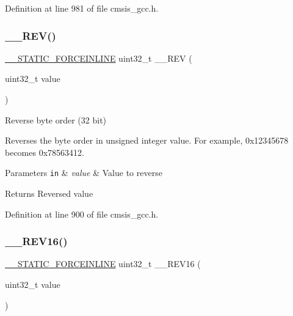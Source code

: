 Definition at line 981 of file cmsis\+\_\+gcc.\+h.

\mbox{\label{group___c_m_s_i_s___core___instruction_interface_gadb92679719950635fba8b1b954072695}} 
\subsubsection{\texorpdfstring{\+\_\+\+\_\+\+R\+E\+V()}{\_\_REV()}}
{\footnotesize\ttfamily \hyperlink{cmsis__iccarm_8h_ab904513442afdf77d4f8c74f23cbb040}{\+\_\+\+\_\+\+S\+T\+A\+T\+I\+C\+\_\+\+F\+O\+R\+C\+E\+I\+N\+L\+I\+NE} uint32\+\_\+t \+\_\+\+\_\+\+R\+EV (\begin{DoxyParamCaption}\item[{uint32\+\_\+t}]{value }\end{DoxyParamCaption})}



Reverse byte order (32 bit) 

Reverses the byte order in unsigned integer value. For example, 0x12345678 becomes 0x78563412. 
\begin{DoxyParams}[1]{Parameters}
\mbox{\tt in}  & {\em value} & Value to reverse \\
\hline
\end{DoxyParams}
\begin{DoxyReturn}{Returns}
Reversed value 
\end{DoxyReturn}


Definition at line 900 of file cmsis\+\_\+gcc.\+h.

\mbox{\label{group___c_m_s_i_s___core___instruction_interface_gaa12aedd096506c9639c1581acd5c6a78}} 
\subsubsection{\texorpdfstring{\+\_\+\+\_\+\+R\+E\+V16()}{\_\_REV16()}}
{\footnotesize\ttfamily \hyperlink{cmsis__iccarm_8h_ab904513442afdf77d4f8c74f23cbb040}{\+\_\+\+\_\+\+S\+T\+A\+T\+I\+C\+\_\+\+F\+O\+R\+C\+E\+I\+N\+L\+I\+NE} uint32\+\_\+t \+\_\+\+\_\+\+R\+E\+V16 (\begin{DoxyParamCaption}\item[{uint32\+\_\+t}]{value }\end{DoxyParamCaption})}



